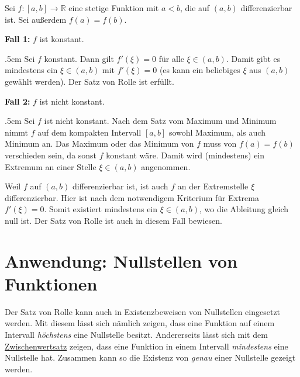 \documentclass[fontsize=9pt,
               parskip=half-,
               DIV=14,
               listof=chapterentry,
               tocflat]{scrbook}
\newenvironment{indentblock}{\begin{adjustwidth}{.5cm}{}}{\end{adjustwidth}}
\newcommand{\proofcase}[2]{\textbf{\textcolor{sblau}{Fall #1:}} #2}
\begin{document}
\begin{proof*}
Sei $f:[a,b]\to \mathbb {R} $ eine stetige Funktion mit $a<b$, die auf $(a,b)$ differenzierbar ist. Sei außerdem $f(a)=f(b)$.

\proofcase{1}{$f$ ist konstant.}
\begin{indentblock}
Sei $f$ konstant. Dann gilt $f'(\xi )=0$ für alle $\xi \in (a,b)$. Damit gibt es mindestens ein $\xi \in (a,b)$ mit $f'(\xi )=0$ (es kann ein beliebiges $\xi $ aus $(a,b)$ gewählt werden). Der Satz von Rolle ist erfüllt.

\end{indentblock}

\proofcase{2}{$f$ ist nicht konstant.}
\begin{indentblock}
Sei $f$ ist nicht konstant. Nach dem Satz vom Maximum und Minimum nimmt $f$ auf dem kompakten Intervall $[a,b]$ sowohl Maximum, als auch Minimum an. Das Maximum oder das Minimum von $f$ muss von $f(a)=f(b)$ verschieden sein, da sonst $f$ konstant wäre. Damit wird (mindestens) ein Extremum an einer Stelle $\xi \in (a,b)$ angenommen.

Weil $f$ auf $(a,b)$ differenzierbar ist, ist auch $f$ an der Extremstelle $\xi $ differenzierbar. Hier ist nach dem notwendigem Kriterium für Extrema $f'(\xi )=0$. Somit existiert mindestens ein $\xi \in (a,b)$, wo die Ableitung gleich null ist. Der Satz von Rolle ist auch in diesem Fall bewiesen.

\end{indentblock}

\end{proof*}

\section{Anwendung: Nullstellen von Funktionen}

Der Satz von Rolle kann auch in Existenzbeweisen von Nullstellen eingesetzt werden. Mit diesem lässt sich nämlich zeigen, dass eine Funktion auf einem Intervall \emph{höchstens} eine Nullstelle besitzt. Andererseits lässt sich mit dem \href{https://de.wikibooks.org/wiki/Mathe\_für\_Nicht-Freaks:\_Zwischenwertsatz}
{Zwischenwertsatz} zeigen, dass eine Funktion in einem Intervall \emph{mindestens} eine Nullstelle hat. Zusammen kann so die Existenz von \emph{genau} einer Nullstelle gezeigt werden.
\end{document}
